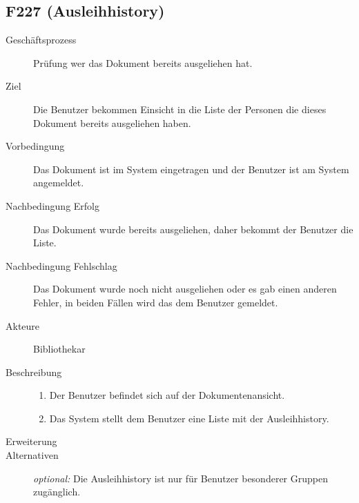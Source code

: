 \subsection{F227 (Ausleihhistory)}
\begin{description}
  \item[Geschäftsprozess]Prüfung wer das Dokument bereits ausgeliehen hat.
  \item[Ziel]Die Benutzer bekommen Einsicht in die Liste der Personen die dieses Dokument bereits ausgeliehen haben.
  \item[Vorbedingung]Das Dokument ist im System eingetragen und der Benutzer ist am System angemeldet.
  \item[Nachbedingung Erfolg]Das Dokument wurde bereits ausgeliehen, daher bekommt der Benutzer die Liste.
  \item[Nachbedingung Fehlschlag]Das Dokument wurde noch nicht ausgeliehen oder es gab einen anderen Fehler, in beiden Fällen wird das dem Benutzer gemeldet.
  \item[Akteure]Bibliothekar
  \item[Beschreibung]\hfill
    \begin{enumerate}
      \item Der Benutzer befindet sich auf der Dokumentenansicht.
      \item Das System stellt dem Benutzer eine Liste mit der Ausleihhistory.
    \end{enumerate}
  \item[Erweiterung]
  \item[Alternativen]\emph{optional:} Die Ausleihhistory ist nur für Benutzer besonderer Gruppen zugänglich.
\end{description}

